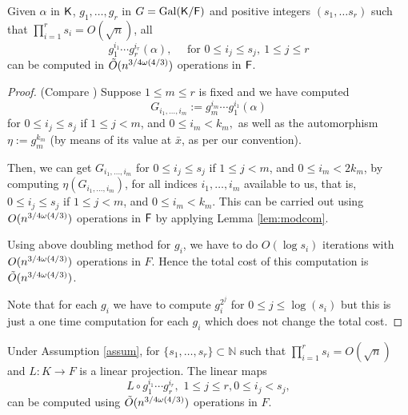 \begin{lemma}\label{lem:selfcomp}
Given $\alpha$ in ${\mathsf{K}}$, $g_1, \ldots , g_{r}$ in $G =
\mathrm{Gal}({\mathsf{K}}/{\mathsf{F}})$ and positive integers $(s_1, \ldots s_r)$ such
that $\prod_{i = 1}^r s_i = O(\sqrt{n})$, all
  $$g_1^{i_1}\cdots g_r^{i_r}(\alpha) ,\quad \text{~for~} 0 \leq i_j
  \leq s_j,\ 1 \leq j \leq r$$ can be computed in $\tilde{O}(n^{3/4 \omega(4/3)})$ operations in ${\mathsf{F}}$.
\end{lemma}
\begin{proof}
(Compare \cite[Lemma~4]{Kaltofen}) Suppose $1 \leq m \leq r$ is
  fixed and we have computed 
$$G_{i_1,\dots,i_m}:=g_m^{i_m}\cdots g_1^{i_1}(\alpha)$$ for $0 \leq
  i_j \leq s_j$ if $1 \leq j < m$, and $0 \leq i_m < k_m,$ as well as
  the automorphism $\eta:=g_m^{k_m}$ (by means of its value at $\bar
  x$, as per our convention).
  
 Then, we can get $G_{i_1,\dots,i_m}$ for $0 \leq i_j \leq s_j$ if $1
 \leq j < m$, and $0 \leq i_m < 2k_m$, by computing
 $\eta(G_{i_1,\dots,i_m})$, for all indices $i_1,\dots,i_m$
 available to us, that is, $0 \leq i_j \leq s_j$ if $1 \leq j < m$,
 and $0 \leq i_m < k_m$. This can be carried out using $O(n^{3/4 \omega(4/3)})$
 operations in ${\mathsf{F}}$ by applying Lemma \ref{lem:modcom}.

 Using above doubling method for $g_i$, we have to
 do $O(\log s_i)$ iterations with $O(n^{3/4 \omega(4/3)})$ operations in $F$. Hence
 the total cost of this computation is $\tilde{O}(n^{3/4 \omega(4/3)})$.

Note that for each $g_i$ we have to compute $g_i^{2^j}$ for $0 \leq j
\leq \log(s_i)$ but this is just a one time computation for each $g_i$
which does not change the total cost.
\end{proof}

\begin{lemma}\label{lem:transmodcomp}
Under Assumption \ref{assum}, for $\lbrace s_1, \ldots, s_r \rbrace \subset \mathbb{N}$
such that $\prod_{i = 1}^r s_i = O(\sqrt{n})$
 and $L: K\rightarrow F$ is a linear projection. The linear maps
$$L \circ g_1^{i_1} \cdots g_r^{i_r}, \,\, 1\leq j \leq r, 0 \leq i_j < s_j, $$ can be computed using $\tilde{O}(n^{3/4 \omega(4/3)})$ operations in $F$. 
\end{lemma} 

